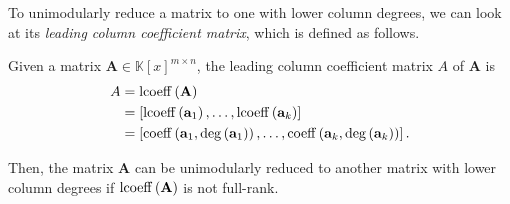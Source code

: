 To unimodularly reduce a matrix to one with lower column degrees,
we can look at its\emph{ leading column coefficient matrix}, which
is defined as follows. 
\begin{defn}
Given a matrix $\mathbf{A}\in\mathbb{K}\left[x\right]^{m\times n}$,
the leading column coefficient matrix $A$ of $\mathbf{A}$ is
\begin{align*}
A & =\operatorname{lcoeff}\left(\mathbf{A}\right)\\
 & =\left[\operatorname{lcoeff}\left(\mathbf{a}_{1}\right),\dots,\operatorname{lcoeff}\left(\mathbf{a}_{k}\right)\right]\\
 & =\left[\operatorname{coeff}\left(\mathbf{a}_{1},\deg\left(\mathbf{a}_{1}\right)\right),\dots,\operatorname{coeff}\left(\mathbf{a}_{k},\deg\left(\mathbf{a}_{k}\right)\right)\right].
\end{align*}

\end{defn}
Then, the matrix $\mathbf{A}$ can be unimodularly reduced to another
matrix with lower column degrees if $\operatorname{lcoeff}\left(\mathbf{A}\right)$
is not full-rank. %
\begin{comment}
In the following, we assume with out loss of generality that matrices
have columns arranged in increasing column degrees. 
\end{comment}

